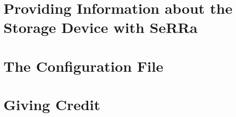 \documentclass[10pt]{report}
\begin{document}


\chapter{Providing Information about the Storage Device with SeRRa} \label{chapter:serra}



\chapter{The Configuration File} \label{chapter:configfile}



\chapter{Giving Credit} \label{chapter:citing}




\balance
%
%

\end{document}
